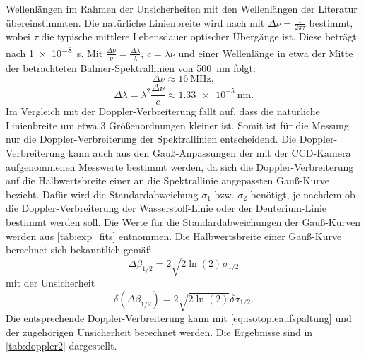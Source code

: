 Wellenlängen im Rahmen der Unsicherheiten mit den Wellenlängen der Literatur übereinstimmten.\newline
\indent Die natürliche Linienbreite wird nach \cite{Demtröder:829119} mit $\Delta \nu = \frac{1}{2 \pi \tau}$ bestimmt, wobei $\tau$
die typische mittlere Lebensdauer optischer Übergänge ist. Diese beträgt nach \cite{Demtröder:829119} \SI{1e-8}{\second}.
Mit $\frac{\Delta \nu}{\nu} = \frac{\Delta \lambda}{\lambda}$, $c = \lambda \nu$ und einer Wellenlänge in etwa der Mitte der betrachteten Balmer-Spektrallinien
von \SI{500}{\nano \meter} folgt:
\begin{equation*}
    \Delta \nu \approx \SI{16}{\mega \hertz} ,
\end{equation*}
\begin{equation*}
    \Delta \lambda = \lambda^2 \frac{\Delta \nu}{c} \approx \SI{1,33e-5}{\nano \meter} .
\end{equation*} Im Vergleich mit der Doppler-Verbreiterung fällt auf, dass die natürliche Linienbreite um etwa 3 Größenordnungen
kleiner ist. Somit ist für die Messung nur die Doppler-Verbreiterung der Spektrallinien entscheidend.\newline
\indent Die Doppler-Verbreiterung kann auch aus den Gauß-Anpassungen der mit der CCD-Kamera aufgenommenen Messwerte bestimmt werden, da sich die
Doppler-Verbreiterung auf die Halbwertsbreite einer an die Spektrallinie angepassten Gauß-Kurve bezieht.
Dafür wird die Standardabweichung $\sigma_1$ bzw. $\sigma_2$ benötigt, je nachdem ob die Doppler-Verbreiterung der Wasserstoff-Linie oder der
Deuterium-Linie bestimmt werden soll. Die Werte für die Standardabweichungen der Gauß-Kurven werden aus \cref{tab:exp_fits} entnommen.
Die Halbwertsbreite einer Gauß-Kurve berechnet sich bekanntlich gemäß
\begin{equation*}
    \Delta \beta_{1/2} = 2 \sqrt{2 \ln(2)} \sigma_{1/2}
\end{equation*} mit der Unsicherheit
\begin{equation*}
    \delta (\Delta \beta_{1/2}) = 2 \sqrt{2 \ln(2)} \delta \sigma_{1/2} .
\end{equation*} Die entsprechende Doppler-Verbreiterung kann mit \ref{eq:isotopieaufspaltung} und der zugehörigen Unsicherheit berechnet werden. Die Ergebnisse sind in \cref{tab:doppler2} dargestellt.
